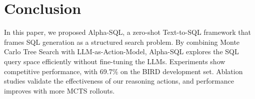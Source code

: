 \section{Conclusion}
\label{sec:conclusion}
In this paper, we proposed Alpha-SQL, a zero-shot Text-to-SQL framework that frames SQL generation as a structured search problem. By combining Monte Carlo Tree Search with LLM-as-Action-Model, Alpha-SQL explores the SQL query space efficiently without fine-tuning the LLMs. Experiments show competitive performance, with 69.7\% on the BIRD development set. Ablation studies validate the effectiveness of our reasoning actions, and performance improves with more MCTS rollouts.

 